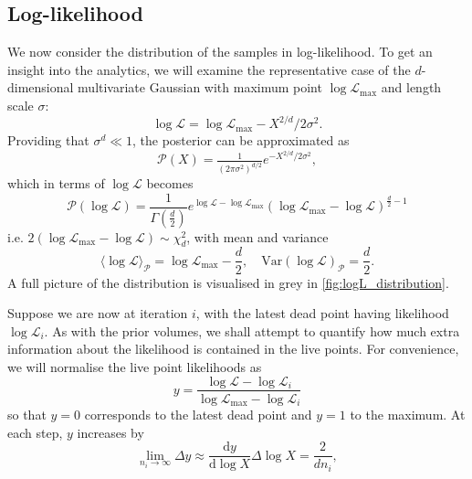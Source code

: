 \documentclass[usenatbib]{mnras}
\newcommand{\nlive}{n_i}
\newcommand{\Like}{\mathcal{L}}
\newcommand{\logLmax}{\log \Like_\mathrm{max}}
\begin{document}
\subsection{Log-likelihood}\label{sec:logL}
We now consider the distribution of the samples in log-likelihood. To get an insight into the analytics, we will examine the representative case of the $d$-dimensional multivariate Gaussian with maximum point $\logLmax$ and length scale $\sigma$:
\begin{equation}\label{eq:gaussian_logL}
    \log \Like = \logLmax - X^{2/d}/2\sigma^2.
\end{equation}
Providing that $\sigma^d \ll 1$, the posterior can be approximated as 
\begin{equation}
    \mathcal{P}(X) = \tfrac{1}{(2\pi\sigma^2)^{d/2}} e^{-X^{2/d}/2\sigma^2}, 
    \label{eqn:PX}
\end{equation}
which in terms of $\log\mathcal{L}$ becomes
\begin{equation}
    \mathcal{P}(\log\mathcal{L}) = \frac{1}{\Gamma\left(\frac{d}{2}\right)}e^{\log\mathcal{L}-\log\mathcal{L}_\mathrm{max}} (\log\mathcal{L}_\mathrm{max}-\log\mathcal{L})^{\frac{d}{2}-1}
\end{equation}
i.e. $2(\log\mathcal{L}_\mathrm{max}-\log\mathcal{L}) \sim \chi^2_{d}$, with mean and variance
\begin{equation}
    \langle\log\mathcal{L}\rangle_\mathcal{P} = \log\mathcal{L}_\mathrm{max} - \frac{d}{2},  \quad \mathrm{Var}(\log\mathcal{L})_\mathcal{P} = \frac{d}{2}.
\end{equation}
A full picture of the distribution is visualised in grey in \cref{fig:logL_distribution}. 
\par
Suppose we are now at iteration $i$, with the latest dead point having likelihood $\log \Like_i$. As with the prior volumes, we shall attempt to quantify how much extra information about the likelihood is contained in the live points. For convenience, we will normalise the live point likelihoods as
\begin{equation}
    y = \frac{\log\mathcal{L}-\log\mathcal{L}_i}{\log\mathcal{L}_\mathrm{max}-\log\mathcal{L}_i}
    \label{eq:y}
\end{equation}
so that $y=0$ corresponds to the latest dead point and $y=1$ to the maximum. At each step, $y$ increases by  
\begin{equation}
    \lim_{\nlive \to \infty}\Delta y \approx \frac{\mathrm{d} y}{\mathrm{d}\log X} \Delta \log X = \frac{2}{d \nlive}, 
\end{equation}
\end{document}
